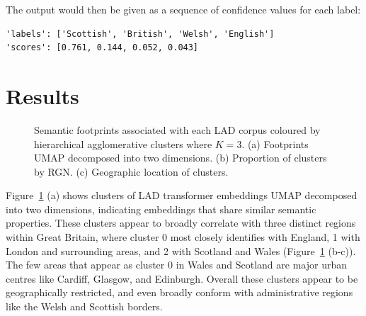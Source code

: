 \documentclass[
]{article}
\begin{document}
The output would then be given as a sequence of confidence values for
each label:

\begin{verbatim}
'labels': ['Scottish', 'British', 'Welsh', 'English']
'scores': [0.761, 0.144, 0.052, 0.043]
\end{verbatim}

\section{Results}\label{sec-results}

\begin{figure}


\caption{\label{fig-clusters}Semantic footprints associated with each
LAD corpus coloured by hierarchical agglomerative clusters where
\(K=3\). (a) Footprints UMAP decomposed into two dimensions. (b)
Proportion of clusters by RGN. (c) Geographic location of clusters.}

\end{figure}%

Figure~\ref{fig-clusters} (a) shows clusters of LAD transformer
embeddings UMAP decomposed into two dimensions, indicating embeddings
that share similar semantic properties. These clusters appear to broadly
correlate with three distinct regions within Great Britain, where
cluster 0 most closely identifies with England, 1 with London and
surrounding areas, and 2 with Scotland and Wales
(Figure~\ref{fig-clusters} (b-c)). The few areas that appear as cluster
0 in Wales and Scotland are major urban centres like Cardiff, Glasgow,
and Edinburgh. Overall these clusters appear to be geographically
restricted, and even broadly conform with administrative regions like
the Welsh and Scottish borders.
\end{document}
